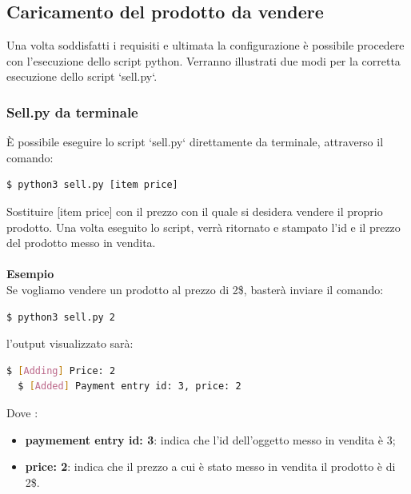 \documentclass[a4paper, 12pt]{article}
\begin{document}
\subsection{Caricamento del prodotto da vendere}
Una volta soddisfatti i requisiti e ultimata la configurazione è possibile procedere con l'esecuzione dello script python. Verranno illustrati due modi per la corretta esecuzione dello script `sell.py`.
\subsubsection{Sell.py da terminale}
È possibile eseguire lo script `sell.py` direttamente da terminale, attraverso il comando:
\begin{lstlisting}[language=bash]
  $ python3 sell.py [item price]
\end{lstlisting}
Sostituire [item price] con il prezzo con il quale si desidera vendere il proprio prodotto.
Una volta eseguito lo script, verrà ritornato e stampato l'id e il prezzo del prodotto messo in vendita.
\\
\\
\textbf{Esempio}
\\
Se vogliamo vendere un prodotto al prezzo di 2\$, basterà inviare il comando:
\begin{lstlisting}[language=bash]
  $ python3 sell.py 2
\end{lstlisting}
l'output visualizzato sarà:
\begin{lstlisting}[language=bash]
  $ [Adding] Price: 2
  $ [Added] Payment entry id: 3, price: 2
\end{lstlisting}
Dove :
\begin{itemize}
  \item \textbf{paymement entry id: 3}: indica che l'id dell'oggetto messo in vendita è 3;
  \item \textbf{price: 2}: indica che il prezzo a cui è stato messo in vendita il prodotto è di 2\$.
\end{itemize}
\end{document}
